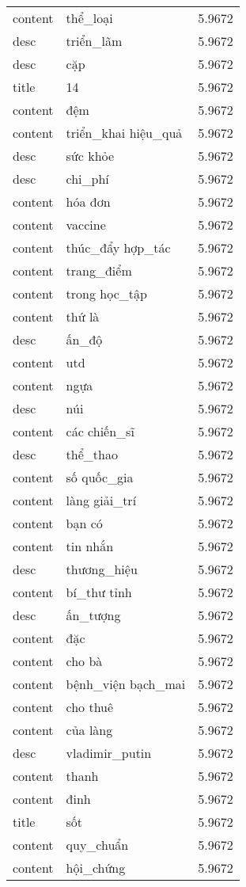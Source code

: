 \documentclass{article}
\begin{document}
\begin{tabular}{lll}
content & thể\_loại & 5.9672\\
desc & triển\_lãm & 5.9672\\
desc & cặp & 5.9672\\
title & 14 & 5.9672\\
content & đệm & 5.9672\\
content & triển\_khai hiệu\_quả & 5.9672\\
desc & sức khỏe & 5.9672\\
desc & chi\_phí & 5.9672\\
content & hóa đơn & 5.9672\\
content & vaccine & 5.9672\\
content & thúc\_đẩy hợp\_tác & 5.9672\\
content & trang\_điểm & 5.9672\\
content & trong học\_tập & 5.9672\\
content & thứ là & 5.9672\\
desc & ấn\_độ & 5.9672\\
content & utd & 5.9672\\
content & ngựa & 5.9672\\
desc & núi & 5.9672\\
content & các chiến\_sĩ & 5.9672\\
desc & thể\_thao & 5.9672\\
content & số quốc\_gia & 5.9672\\
content & làng giải\_trí & 5.9672\\
content & bạn có & 5.9672\\
content & tin nhắn & 5.9672\\
desc & thương\_hiệu & 5.9672\\
content & bí\_thư tỉnh & 5.9672\\
desc & ấn\_tượng & 5.9672\\
content & đặc & 5.9672\\
content & cho bà & 5.9672\\
content & bệnh\_viện bạch\_mai & 5.9672\\
content & cho thuê & 5.9672\\
content & của làng & 5.9672\\
desc & vladimir\_putin & 5.9672\\
content & thanh & 5.9672\\
content & đinh & 5.9672\\
title & sốt & 5.9672\\
content & quy\_chuẩn & 5.9672\\
content & hội\_chứng & 5.9672\\

\end{tabular}
\end{document}
